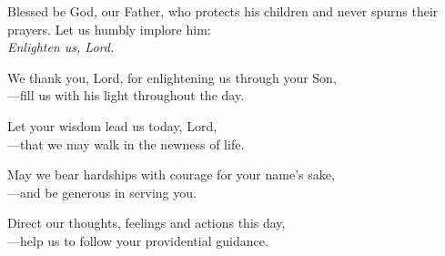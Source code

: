 \intercessions

\begin{raggedright}
Blessed be God, our Father, who protects his children and never spurns their prayers. Let us humbly implore him:\\
\emph{Enlighten us, Lord.}

\medskip
We thank you, Lord, for enlightening us through your Son,\\
{\color{red}---}fill us with his light throughout the day.

\medskip
Let your wisdom lead us today, Lord,\\
{\color{red}---}that we may walk in the newness of life.

\medskip
May we bear hardships with courage for your name’s sake,\\
{\color{red}---}and be generous in serving you.

\medskip
Direct our thoughts, feelings and actions this day,\\
{\color{red}---}help us to follow your providential guidance.
\end{raggedright}